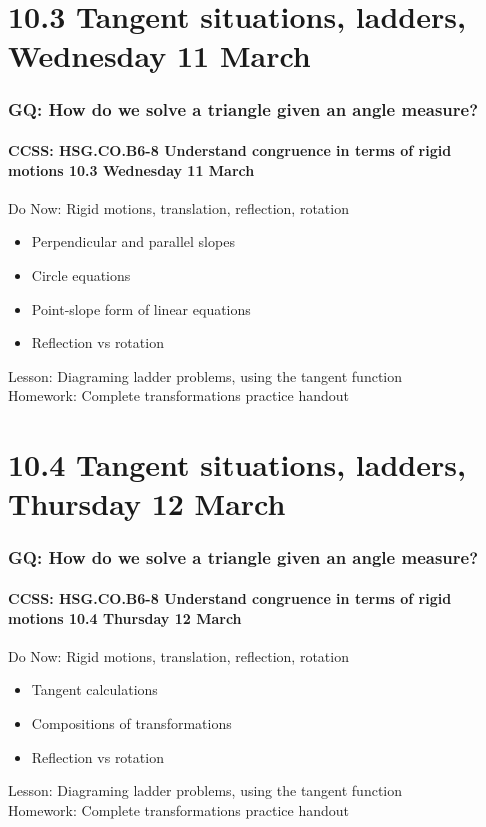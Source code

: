 \documentclass{beamer}
\begin{document}
\section{10.3 Tangent situations, ladders, Wednesday 11 March} 
\frame
{
  \frametitle{GQ: How do we solve a triangle given an angle measure?}
  \framesubtitle{CCSS: HSG.CO.B6-8 Understand congruence in terms of rigid motions \hfill \alert{10.3 Wednesday 11 March}}

  \begin{block}{Do Now: Rigid motions, translation, reflection, rotation}
    \begin{itemize}
      \item Perpendicular and parallel slopes
      \item Circle equations
      \item Point-slope form of linear equations
      \item Reflection vs rotation
    \end{itemize}
    \end{block}
    Lesson: Diagraming ladder problems, using the tangent function \\
    Homework: Complete transformations practice handout
}

\section{10.4 Tangent situations, ladders, Thursday 12 March} 
  \frame
  {
    \frametitle{GQ: How do we solve a triangle given an angle measure?}
    \framesubtitle{CCSS: HSG.CO.B6-8 Understand congruence in terms of rigid motions \hfill \alert{10.4 Thursday 12 March}}

    \begin{block}{Do Now: Rigid motions, translation, reflection, rotation}
      \begin{itemize}
        \item Tangent calculations
        \item Compositions of transformations
        \item Reflection vs rotation
      \end{itemize}
      \end{block}
      Lesson: Diagraming ladder problems, using the tangent function \\
      Homework: Complete transformations practice handout
  }
\end{document}

